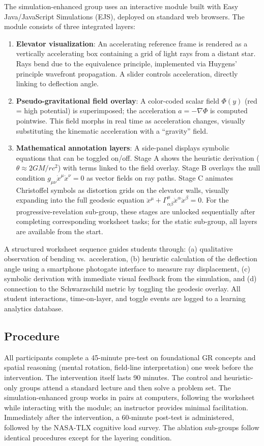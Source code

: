 \documentclass{article}
\begin{document}
\begin{itemize}
The simulation-enhanced group uses an interactive module built with Easy Java/JavaScript Simulations (EJS), deployed on standard web browsers. The module consists of three integrated layers:
\begin{enumerate}
    \item \textbf{Elevator visualization}: An accelerating reference frame is rendered as a vertically accelerating box containing a grid of light rays from a distant star. Rays bend due to the equivalence principle, implemented via Huygens' principle wavefront propagation. A slider controls acceleration, directly linking to deflection angle.
    \item \textbf{Pseudo-gravitational field overlay}: A color-coded scalar field $\Phi(y)$ (red = high potential) is superimposed; the acceleration $a = -\nabla\Phi$ is computed pointwise. This field morphs in real time as acceleration changes, visually substituting the kinematic acceleration with a ``gravity'' field.
    \item \textbf{Mathematical annotation layers}: A side-panel displays symbolic equations that can be toggled on/off. Stage A shows the heuristic derivation ($\theta \approx 2GM/rc^2$) with terms linked to the field overlay. Stage B overlays the null condition $g_{\mu\nu}\dot{x}^\mu\dot{x}^\nu=0$ as vector fields on ray paths. Stage C animates Christoffel symbols as distortion grids on the elevator walls, visually expanding into the full geodesic equation $\ddot{x}^\mu + \Gamma^\mu_{\alpha\beta}\dot{x}^\alpha\dot{x}^\beta = 0$. For the progressive-revelation sub-group, these stages are unlocked sequentially after completing corresponding worksheet tasks; for the static sub-group, all layers are available from the start.
\end{enumerate}
A structured worksheet sequence guides students through: (a) qualitative observation of bending vs.\ acceleration, (b) heuristic calculation of the deflection angle using a smartphone photogate interface to measure ray displacement, (c) symbolic derivation with immediate visual feedback from the simulation, and (d) connection to the Schwarzschild metric by toggling the geodesic overlay. All student interactions, time-on-layer, and toggle events are logged to a learning analytics database.

\subsection{Procedure}
All participants complete a 45-minute pre-test on foundational GR concepts and spatial reasoning (mental rotation, field-line interpretation) one week before the intervention. The intervention itself lasts 90 minutes. The control and heuristic-only groups attend a standard lecture and then solve a problem set. The simulation-enhanced group works in pairs at computers, following the worksheet while interacting with the module; an instructor provides minimal facilitation. Immediately after the intervention, a 60-minute post-test is administered, followed by the NASA-TLX cognitive load survey. The ablation sub-groups follow identical procedures except for the layering condition.


\end{itemize}
\end{document}
